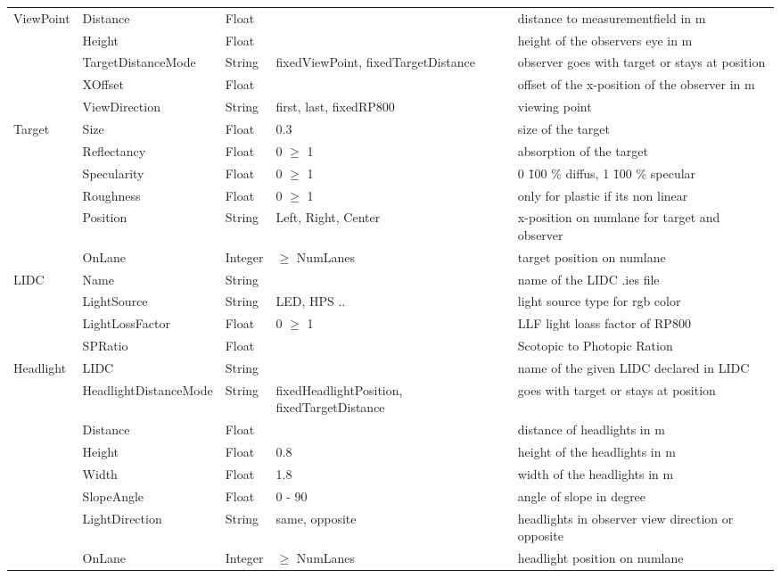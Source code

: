 \documentclass[10pt,a4paper]{report}
\begin{document}
\begin{landscape}
\begin{longtable}{lllp{4cm}p{6cm}}
	\rowcolor{hellgrau}
		ViewPoint & Distance & Float & & distance to measurementfield in m \\\rowcolor{hellgrau}
		 & Height & Float & & height of the observers eye in m \\\rowcolor{hellgrau}
		 & TargetDistanceMode & String & fixedViewPoint, fixedTargetDistance & observer goes with target or stays at position \\\rowcolor{hellgrau}
		 & XOffset & Float & & offset of the x-position of the observer in m \\\rowcolor{hellgrau}
		 & ViewDirection & String & first, last, fixedRP800 & viewing point \\
	
		Target & Size & Float & 0.3 & size of the target \\
		 & Reflectancy & Float & 0 $\geq$ 1 & absorption of the target \\
		 & Specularity & Float & 0 $\geq$ 1 & 0 \= 100 \% diffus, 1 \= 100 \% specular \\
		 & Roughness & Float & 0 $\geq$ 1 & only for plastic if its non linear \\
		 & Position & String & Left, Right, Center & x-position on numlane for target and observer \\ 
		 & OnLane & Integer & $\geq$ NumLanes & target position on numlane \\
	
	\rowcolor{hellgrau}
		LIDC & Name & String & & name of the LIDC .ies file \\\rowcolor{hellgrau}
		 & LightSource & String & LED, HPS .. & light source type for rgb color \\\rowcolor{hellgrau}
		 & LightLossFactor & Float & 0 $\geq$ 1 & LLF light loass factor of RP800 \\\rowcolor{hellgrau}
		 & SPRatio & Float & & Scotopic to Photopic Ration \\
	
		Headlight & LIDC & String & & name of the given LIDC declared in LIDC \\
		 & HeadlightDistanceMode & String & fixedHeadlightPosition, fixedTargetDistance & goes with target or stays at position \\
		 & Distance & Float & & distance of headlights in m \\
		 & Height & Float & 0.8 & height of the headlights in m \\ 
		 & Width & Float & 1.8 & width of the headlights in m \\
		 & SlopeAngle & Float & 0 - 90 & angle of slope in degree \\
		 & LightDirection & String & same, opposite & headlights in observer view direction or opposite \\
		 & OnLane & Integer & $\geq$ NumLanes & headlight position on numlane \\
	

\end{longtable}
\end{landscape}
\end{document}

